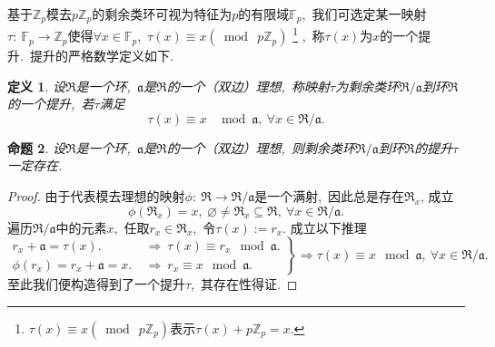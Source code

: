\documentclass[UTF8, twoside]{ctexart}
\theoremstyle{nonumberplain}
\newtheorem{proof}{\heiti 证明}  %
\theoremstyle{nonumberplain}
\theoremstyle{plain}
\newtheorem{dingyi}{定义}[subsection]
\newtheorem{mingti}[dingyi]{命题}
\begin{document}
	基于${{\mathbb{Z}}_{p}}$模去$p{{\mathbb{Z}}_{p}}$的剩余类环可视为特征为$p$的有限域${{\mathbb{F}}_{p}}$,\ 我们可选定某一映射$\tau :\ {{\mathbb{F}}_{p}}\to {{\mathbb{Z}}_{p}}$使得$\forall x\in {{\mathbb{F}}_{p}}$,\ $\tau \left( x \right)\equiv x\left( \bmod\ p{{\mathbb{Z}}_{p}} \right)$
	\footnote{$\tau \left( x \right)\equiv x\left( \bmod\ p{{\mathbb{Z}}_{p}} \right)$表示$\tau \left( x \right)+p{{\mathbb{Z}}_{p}}=x.$}
	,\ 
	称$\tau \left( x \right)$为$x$的一个提升.\ 提升的严格数学定义如下.\ 
	\begin{dingyi} \label{提升定义}
		设$\Re $是一个环,\ $\mathfrak{a}$是$\Re $的一个（双边）理想,\ 称映射$\tau $为剩余类环$\Re /\mathfrak{a}$到环$\Re $的一个{\heiti 提升},\ 若$\tau $满足
		\[
			\tau \left( x \right)\equiv x\text{ }\bmod \mathfrak{a},
			\ \forall x\in \Re /\mathfrak{a}.
		\]
	\end{dingyi}
	\begin{mingti} \label{提升存在性}
		设$\Re $是一个环,\ $\mathfrak{a}$是$\Re $的一个（双边）理想,\ 则剩余类环$\Re /\mathfrak{a}$到环$\Re $的提升$\tau $一定存在.\ 
	\end{mingti}
	\begin{proof}
		由于代表模去理想的映射$\phi :\ \Re \to \Re /\mathfrak{a}$是一个满射,\ 因此总是存在${{\Re }_{x}}$, 成立
		\[
			\phi \left( {{\Re }_{x}} \right)=x,
			\ \varnothing \ne {{\Re }_{x}}\subseteq \Re ,
			\ \forall x\in \Re /\mathfrak{a}.
		\]
		遍历$\Re /\mathfrak{a}$中的元素$x$,\ 任取${{r}_{x}}\in {{\Re }_{x}}$,\ 令$\tau \left( x \right):={{r}_{x}}$. 成立以下推理
		\[
		\left. \begin{aligned}
			{{r}_{x}}+\mathfrak{a}=\tau \left( x \right).\ &\Longrightarrow \ \tau \left( x \right)\equiv {{r}_{x}}\ \bmod \mathfrak{a}. \\ 
			\phi \left( {{r}_{x}} \right)={{r}_{x}}+\mathfrak{a}=x.
			\ &\Longrightarrow \ {{r}_{x}}\equiv x
			\ \bmod \mathfrak{a}.
		\end{aligned} \right\}\Longrightarrow \tau \left( x \right)\equiv x\ \bmod \mathfrak{a},\ \forall x\in \Re /\mathfrak{a}.	
		\]
		至此我们便构造得到了一个提升$\tau $,\ 其存在性得证.
	\end{proof}
	\vskip 0.5cm
	
\end{document}
